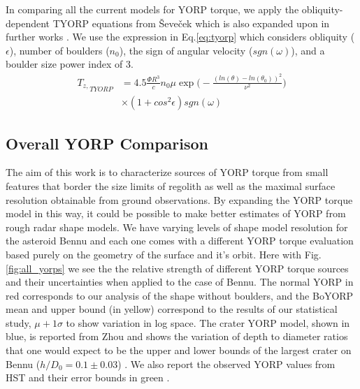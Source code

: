 In comparing all the current models for YORP torque, we apply the obliquity-dependent TYORP equations from Ševeček which is also expanded upon in further works \citep{Sevecek2016} \citep{Golubov2019}. We use the expression in Eq.\ref{eq:tyorp} which considers obliquity ($\epsilon$), number of boulders ($n_0$), the sign of angular velocity ($sgn(\omega)$), and a boulder size power index of 3. 
\begin{equation}\label{eq:tyorp}
    \begin{split}
    {T_{z,}}_{TYORP} & = 4.5 \frac{\Phi R^3}{c}n_0 \mu \exp \Bigg( -\frac{(ln(\theta)-ln(\theta_0))^2}{\nu^2}\Bigg)\\
    & \times (1+cos^2\epsilon)sgn(\omega)
    \end{split}
\end{equation}

\subsection{Overall YORP Comparison}


The aim of this work is to characterize sources of YORP torque from small features that border the size limits of regolith as well as the maximal surface resolution obtainable from ground observations. By expanding the YORP torque model in this way, it could be possible to make better estimates of YORP from rough radar shape models. We have varying levels of shape model resolution for the asteroid Bennu and each one comes with a different YORP torque evaluation based purely on the geometry of the surface and it's orbit. Here with Fig. \ref{fig:all_yorps} we see the the relative strength of different YORP torque sources and their uncertainties when applied to the case of Bennu. The normal YORP in red corresponds to our analysis of the shape without boulders, and the BoYORP mean and upper bound (in yellow) correspond to the results of our statistical study, $\mu+1\sigma$ to show variation in log space. The crater YORP model, shown in blue, is reported from Zhou and shows the variation  of depth to diameter ratios that one would expect to be the upper and lower bounds of the largest crater on Bennu ($h/D_0 = 0.1\pm0.03$) \citep{Zhou2022} \citep{Daly2020a}. We also report the observed YORP values from HST and their error bounds in green \citep{Nolan2019}.

